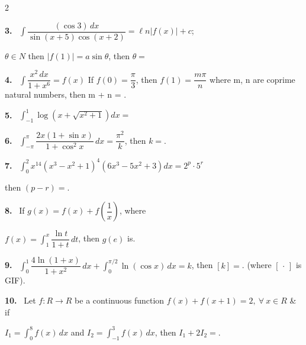 \documentclass[10pt]{extarticle}
\newcommand{\qn}[1]{\par\smallskip\noindent\textbf{#1.}~}
\begin{document}
\begin{multicols}{2}
\qn{3} $\displaystyle\int\dfrac{(\cos3)\,dx}{\sin(x+5)\cos(x+2)}=\ell n\left|f(x)\right|+c$;\par
$\theta\in N$ then $|f(1)|=a\sin\theta$, then $\theta=$
\qn{4} $\displaystyle\int\dfrac{x^2\,dx}{1+x^6}=f(x)$ If $f(0)=\dfrac\pi3$, then $f(1)=\dfrac{m\pi}n$ where m, n are coprime natural numbers, then m + n = \underline{\hspace{1cm}}.
\qn{5} $\displaystyle\int_{-1}^{1}\log\!\left(x+\sqrt{x^2+1}\right)dx=$\underline{\hspace{1cm}}
\qn{6} $\displaystyle\int_{-\pi}^{\pi}\dfrac{2x(1+\sin x)}{1+\cos^2x}\,dx=\dfrac{\pi^2}k$, then $k=$\underline{\hspace{1cm}}.
\qn{7} $\displaystyle\int_0^2x^{14}\left(x^3-x^2+1\right)^4\left(6x^3-5x^2+3\right)dx=2^p\cdot5^r$\par
then $(p-r)=$\underline{\hspace{1cm}}.
\qn{8} If $g(x)=f(x)+f\!\left(\dfrac1x\right)$, where\par
$f(x)=\displaystyle\int_1^x\dfrac{\ln t}{1+t}\,dt$, then $g(e)$ is\underline{\hspace{1cm}}.
\qn{9} $\displaystyle\int_0^1\dfrac{4\ln(1+x)}{1+x^2}\,dx+\int_0^{\pi/2}\ln(\cos x)\,dx=k$, then $[k]=$\underline{\hspace{1cm}}. (where $[\,\cdot\,]$ is GIF).
\qn{10} Let $f:R\to R$ be a continuous function $f(x)+f(x+1)=2,\ \forall\ x\in R$ \& if\par
$I_1=\displaystyle\int_0^8f(x)\,dx$ and $I_2=\displaystyle\int_{-1}^3f(x)\,dx$, then $I_1+2I_2=$\underline{\hspace{1cm}}.
\end{multicols}
\end{document}
